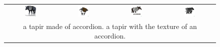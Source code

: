 \begin{figure}[ht!]
\begin{tabular}{cccc}
        \includegraphics[width=0.24\textwidth]{figures/cross/tapir_0.jpg} &
        \includegraphics[width=0.24\textwidth]{figures/cross/tapir_1.jpg} &
        \includegraphics[width=0.24\textwidth]{figures/cross/tapir_2.jpg} &
        \includegraphics[width=0.24\textwidth]{figures/cross/tapir_3.jpg} \vspace{-1mm}\\
        \multicolumn{4}{c}{\small a tapir made of accordion. a tapir with the texture of an accordion.}\\
        

\end{tabular}
\end{figure}
